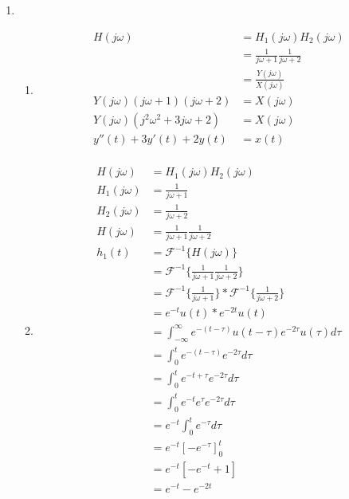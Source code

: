 \documentclass[10pt,a4paper, margin=1in]{article}
\begin{document}
\begin{enumerate}
\item %
	\begin{enumerate}
    \item %
    \begin{align*}
        H(j\omega) &= H_1(j\omega)H_2(j\omega) \\
        &= \frac{1}{j\omega + 1}\frac{1}{j\omega + 2} \\
        &= \frac{Y(j\omega)}{X(j\omega)} \\
        Y(j\omega)(j\omega + 1)(j\omega + 2) &= X(j\omega) \\
        Y(j\omega)(j^2\omega^2 + 3j\omega + 2) &= X(j\omega) \\
        y''(t) + 3y'(t) + 2y(t) &= x(t) \\
    \end{align*}
    \item %
    \begin{align*}
        H(j\omega) &= H_1(j\omega)H_2(j\omega) \\
        H_1(j\omega) &= \frac{1}{j\omega + 1} \\
        H_2(j\omega) &= \frac{1}{j\omega + 2} \\
        H(j\omega) &= \frac{1}{j\omega + 1}\frac{1}{j\omega + 2} \\
        h_1(t) &= \mathcal{F}^{-1}\{H(j\omega)\} \\
        &= \mathcal{F}^{-1}\{\frac{1}{j\omega + 1}\frac{1}{j\omega + 2}\} \\
        &= \mathcal{F}^{-1}\{\frac{1}{j\omega + 1}\} * \mathcal{F}^{-1}\{\frac{1}{j\omega + 2}\} \\
        &= e^{-t}u(t) * e^{-2t}u(t) \\
        &= \int_{-\infty}^{\infty}e^{-(t - \tau)}u(t - \tau)e^{-2\tau}u(\tau)d\tau \\
        &= \int_{0}^{t}e^{-(t - \tau)}e^{-2\tau}d\tau \\
        &= \int_{0}^{t}e^{-t + \tau}e^{-2\tau}d\tau \\
        &= \int_{0}^{t}e^{-t}e^{\tau}e^{-2\tau}d\tau \\
        &= e^{-t}\int_{0}^{t}e^{-\tau}d\tau \\
        &= e^{-t}\left[-e^{-\tau}\right]_{0}^{t} \\
        &= e^{-t}\left[-e^{-t} + 1\right] \\
        &= e^{-t} - e^{-2t} \\

\end{align*}
\end{enumerate}
\end{enumerate}
\end{document}
